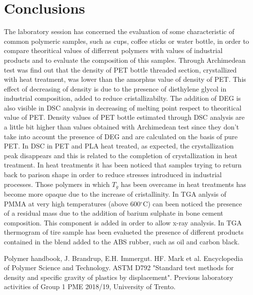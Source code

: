 \documentclass[a4paper, 11pt]{article}
\begin{document}
\section{Conclusions}

The laboratory session has concerned the evaluation of some characteristic of common polymeric samples, such as cups, coffee sticks or water bottle, in order to compare theoritical values of  differrent polymers with values of industrial products and  to evaluate the composition of this samples.
Through Archimedean test was find out that the density of PET bottle threaded section, crystallized with heat treatment, was lower than the amorphus value of density of PET. This effect of decreasing of density is due to the presence of diethylene glycol in industrial composition, added to reduce cristallizabilty. 
The addition of DEG is also visible in DSC analysis in decreasing of melting point respect to theoritical value of PET. Density values of PET bottle estimated through DSC analysis are a little bit higher than values obtained with Archimedean test since they don't take into account the presence of DEG and are calculated on the basis of pure PET. 
In DSC in PET and PLA heat treated, as expected, the crystallization peak disappears and this is related to the completion of crystallization in heat treatment. 
In heat treatments it has been noticed that samples trying to return back to parison shape in order to reduce stresses introduced in industrial processes. Those polymers in which $T_g$ has been overcame in heat treatments has become more opaque due to the increase of cristallinity. 
In TGA anlysis of PMMA at very high temperatures (above  600$^\circ$C) can been noticed the presence of a residual mass due to the addition of barium sulphate in bone cement composition. This component is added in order to allow x-ray analysis. In TGA thermogram of tire sample has been evalueted the presence
of different products contained in the blend added to the ABS rubber, such as oil and carbon black.

\newpage
\thispagestyle{empty}

\begin{thebibliography}{1}

 Polymer handbook, J. Brandrup, E.H. Immergut.
 HF. Mark et al. Encyclopedia of Polymer Science and Technology.
 ASTM D792 "Standard test methods for density and specific gravity of plastics by displacement".
 Previous laboratory activities of Group 1 PME 2018/19, University of Trento. 

\end{thebibliography}
\end{document}
